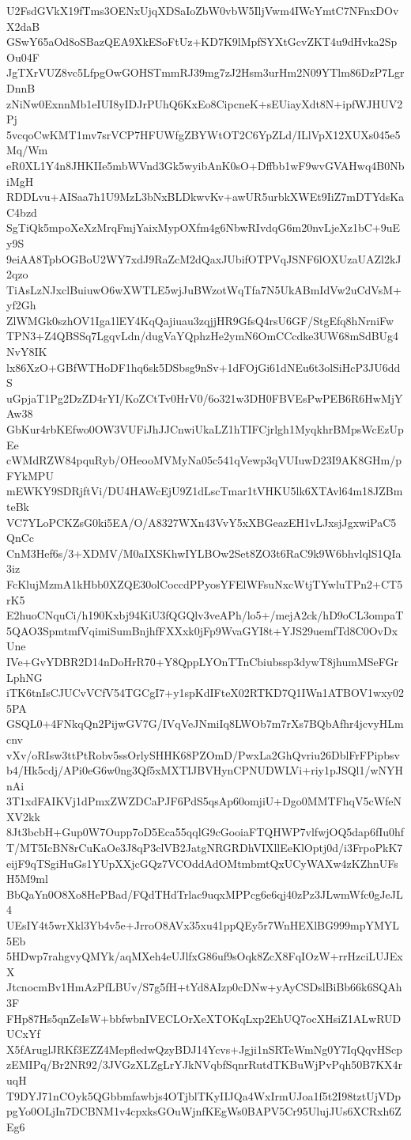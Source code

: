 U2FsdGVkX19fTms3OENxUjqXDSaIoZbW0vbW5IljVwm4IWcYmtC7NFnxDOvX2daB
GSwY65aOd8oSBazQEA9XkESoFtUz+KD7K9lMpfSYXtGcvZKT4u9dHvka2SpOu04F
JgTXrVUZ8vc5LfpgOwGOHSTmmRJ39mg7zJ2Hsm3urHm2N09YTlm86DzP7LgrDnnB
zNiNw0ExnnMb1eIUI8yIDJrPUhQ6KxEo8CipcneK+sEUiayXdt8N+ipfWJHUV2Pj
5vcqoCwKMT1mv7srVCP7HFUWfgZBYWtOT2C6YpZLd/ILlVpX12XUXs045e5Mq/Wm
eR0XL1Y4n8JHKIIe5mbWVnd3Gk5wyibAnK0sO+Dffbb1wF9wvGVAHwq4B0NbiMgH
RDDLvu+AISaa7h1U9MzL3bNxBLDkwvKv+awUR5urbkXWEt9IiZ7mDTYdsKaC4bzd
SgTiQk5mpoXeXzMrqFmjYaixMypOXfm4g6NbwRIvdqG6m20nvLjeXz1bC+9uEy9S
9eiAA8TpbOGBoU2WY7xdJ9RaZcM2dQaxJUbifOTPVqJSNF6lOXUzaUAZl2kJ2qzo
TiAsLzNJxclBuiuwO6wXWTLE5wjJuBWzotWqTfa7N5UkABmIdVw2uCdVsM+yf2Gh
ZlWMGk0szhOV1Iga1lEY4KqQajiuau3zqjjHR9GfsQ4rsU6GF/StgEfq8hNrniFw
TPN3+Z4QBSSq7LgqvLdn/dugVaYQphzHe2ymN6OmCCcdke3UW68mSdBUg4NvY8IK
lx86XzO+GBfWTHoDF1hq6sk5DSbsg9nSv+1dFOjGi61dNEu6t3olSiHcP3JU6ddS
uGpjaT1Pg2DzZD4rYI/KoZCtTv0HrV0/6o321w3DH0FBVEsPwPEB6R6HwMjYAw38
GbKur4rbKEfwo0OW3VUFiJhJJCnwiUkaLZ1hTIFCjrlgh1MyqkhrBMpsWcEzUpEe
cWMdRZW84pquRyb/OHeooMVMyNa05c541qVewp3qVUIuwD23I9AK8GHm/pFYkMPU
mEWKY9SDRjftVi/DU4HAWcEjU9Z1dLscTmar1tVHKU5lk6XTAvl64m18JZBmteBk
VC7YLoPCKZsG0ki5EA/O/A8327WXn43VvY5xXBGeazEH1vLJxsjJgxwiPaC5QnCc
CnM3Hef6s/3+XDMV/M0aIXSKhwIYLBOw2Set8ZO3t6RaC9k9W6bhvlqlS1QIa3iz
FcKlujMzmA1kHbb0XZQE30olCoccdPPyosYFElWFsuNxcWtjTYwluTPn2+CT5rK5
E2huoCNquCi/h190Kxbj94KiU3fQGQlv3veAPh/lo5+/mejA2ck/hD9oCL3ompaT
5QAO3SpmtmfVqimiSumBnjhfFXXxk0jFp9WvaGYI8t+YJS29uemfTd8C0OvDxUne
IVe+GvYDBR2D14nDoHrR70+Y8QppLYOnTTnCbiubssp3dywT8jhumMSeFGrLphNG
iTK6tnIsCJUCvVCfV54TGCgI7+y1spKdIFteX02RTKD7Q1IWn1ATBOV1wxy025PA
GSQL0+4FNkqQn2PijwGV7G/IVqVeJNmiIq8LWOb7m7rXs7BQbAfhr4jcvyHLmcnv
vXv/oRIsw3ttPtRobv5ssOrlySHHK68PZOmD/PwxLa2GhQvriu26DblFrFPipbsv
b4/Hk5cdj/APi0eG6w0ng3Qf5xMXTIJBVHynCPNUDWLVi+riy1pJSQl1/wNYHnAi
3T1xdFAIKVj1dPmxZWZDCaPJF6PdS5qsAp60omjiU+Dgo0MMTFhqV5cWfeNXV2kk
8Jt3bcbH+Gup0W7Oupp7oD5Eca55qqlG9cGooiaFTQHWP7vlfwjOQ5dap6fIu0hf
T/MT5IcBN8rCuKaOe3J8qP3clVB2JatgNRGRDhVIXllEeKlOptj0d/i3FrpoPkK7
eijF9qTSgiHuGs1YUpXXjcGQz7VCOddAdOMtmbmtQxUCyWAXw4zKZhnUFsH5M9ml
BbQaYn0O8Xo8HePBad/FQdTHdTrlac9uqxMPPcg6e6qj40zPz3JLwmWfc0gJeJL4
UEsIY4t5wrXkl3Yb4v5e+JrroO8AVx35xu41ppQEy5r7WnHEXlBG999mpYMYL5Eb
5HDwp7rahgvyQMYk/aqMXeh4eUJlfxG86uf9sOqk8ZcX8FqIOzW+rrHzciLUJExX
JtcnocmBv1HmAzPfLBUv/S7g5fH+tYd8AIzp0cDNw+yAyCSDslBiBb66k6SQAh3F
FHp87Hs5qnZeIsW+bbfwbnIVECLOrXeXTOKqLxp2EhUQ7ocXHsiZ1ALwRUDUCxYf
X5fAruglJRKf3EZZ4MepfledwQzyBDJ14Ycvs+Jgji1nSRTeWmNg0Y7IqQqvHScp
zEMIPq/Br2NR92/3JVGzXLZgLrYJkNVqbfSqnrRutdTKBuWjPvPqh50B7KX4ruqH
T9DYJ71nCOyk5QGbbmfawbjs4OTjblTKyIIJQa4WxIrmUJoa1f5t2I98tztUjVDp
pgYo0OLjIn7DCBNM1v4cpxksGOuWjnfKEgWs0BAPV5Cr95UlujJUs6XCRxh6ZEg6
